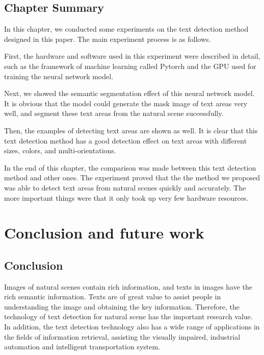 \documentclass[22pt, UTF8]{article}
\numberwithin{figure}{section}
\numberwithin{table}{section}
\numberwithin{equation}{section} %
\begin{document}
\subsection{Chapter Summary}

\setlength\parindent{2em} In this chapter, we conducted some experiments on the text detection method designed in this paper. The main experiment process is as follows.

\setlength\parindent{2em} First, the hardware and software used in this experiment were described in detail, such as the framework of machine learning called Pytorch and the GPU used for training the neural network model.

\setlength\parindent{2em} Next, we showed the semantic segmentation effect of this neural network model. It is obvious that the model could generate the mask image of text areas very well, and segment these text areas from the natural scene successfully.

\setlength\parindent{2em} Then, the examples of detecting text areas are shown as well. It is clear that this text detection method has a good detection effect on text areas with different sizes, colors, and multi-orientations.

\setlength\parindent{2em} In the end of this chapter, the comparison was made between this text detection method and other ones. The experiment proved that the the method we proposed was able to detect text areas from natural scenes quickly and accurately. The more important things were that it only took up very few hardware resources.

\newpage

\section{Conclusion and future work}

\subsection{Conclusion}

\setlength\parindent{2em} Images of natural scenes contain rich information, and texts in images have the rich semantic information. Texts are of great value to assist people in understanding the image and obtaining the key information. Therefore, the technology of text detection for natural scene has the important research value. In addition, the text detection technology also has a wide range of applications in the fields of information retrieval, assisting the visually impaired, industrial automation and intelligent transportation system.
\end{document}
